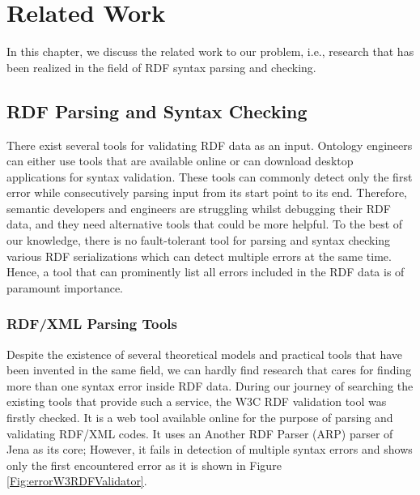 \chapter{Related Work}
\label{ch:related}


In this chapter, we discuss the related work to our problem, i.e., research that has been realized in the field of RDF syntax parsing and checking.

\section{RDF Parsing and Syntax Checking}

There exist several tools for validating RDF data as an input.
Ontology engineers can either use tools that are available online or can download desktop applications for syntax validation.
These tools  can commonly detect only the first error while consecutively parsing input from its start point to its end. 
Therefore, semantic developers and engineers are struggling whilst debugging their RDF data, and they need alternative tools that could be more helpful. 
To the best of our knowledge, there is no fault-tolerant tool for parsing and syntax checking various RDF serializations which can detect multiple errors at the same time.  
Hence, a tool that can prominently list all errors included in the RDF data is of paramount importance.

\subsection{RDF/XML Parsing Tools}

Despite the existence of several theoretical models and practical tools that have been invented in the same field, we can hardly find  research that cares for finding more than one syntax error inside RDF data. 
During our journey of searching the existing tools that provide such a service, the W3C RDF validation tool \cite{W3C:Validation:Online} was firstly checked.
It is a web tool available online for the purpose of parsing and validating RDF/XML codes. 
It uses an Another RDF Parser (ARP) parser of Jena \cite{McBride:2002:JSW:613357.613755} as its core; However, it fails in detection of multiple syntax errors and shows only the first encountered error as it is shown in Figure \ref{Fig:errorW3RDFValidator}.
 
